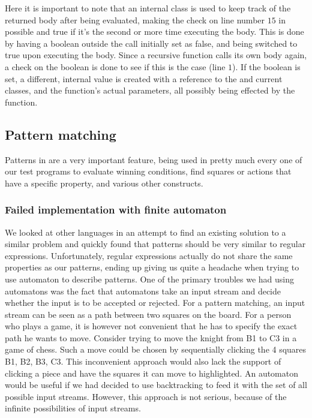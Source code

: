 

Here it is important to note that an internal  class  is used to keep track of the
returned body after being evaluated, making the check on line number $15$ in
 possible and true if it's the second or more time executing the body. This is done by having a boolean outside
the call initially set as false, and being switched to true upon executing the
body. Since a recursive function calls its own body again, a check on the
boolean is done to see if this is the case (line $1$). If the boolean is set, a different,
internal value  is created with a reference to the
 and current  classes, and the function's
actual parameters, all possibly being effected by the function.

\subsection{Pattern matching}
\label{sec:patternmatching}
Patterns in \productname{} are a very important feature, being used in pretty
much every one of our test programs to evaluate winning conditions, find squares
or actions that have a specific property, and various other constructs.

\subsubsection{Failed implementation with finite automaton}
We looked at other languages in an attempt to find an existing solution to a
similar problem and quickly found that patterns should be very similar to
regular expressions. Unfortunately, regular expressions actually do not share
the same properties as our patterns, ending up giving us quite a headache when
trying to use automaton to describe patterns. One of the primary troubles we had
using automatons was the fact that automatons take an input stream and decide
whether the input is to be accepted or rejected. For a pattern matching, an
input stream can be seen as a path between two squares on the board. For a
person who plays a \productname{} game, it is however not convenient that he has
to specify the exact path he wants to move. Consider trying to move the knight
from B1 to C3 in a game of chess. Such a move could be chosen by sequentially
clicking the 4 squares B1, B2, B3, C3. This inconvenient approach would also
lack the support of clicking a piece and have the squares it can move to
highlighted. An automaton would be useful if we had decided to use backtracking
to feed it with the set of all possible input streams. However, this approach is 
not serious, because of the infinite possibilities of input streams. 

